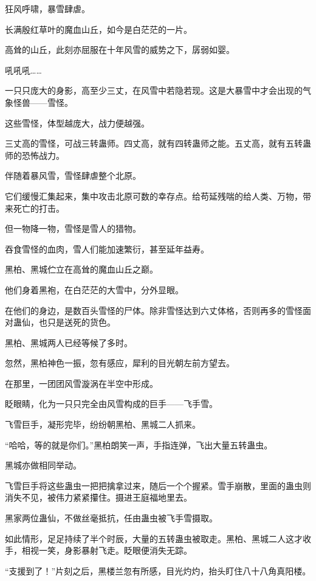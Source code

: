
\begin{this_body}

狂风呼啸，暴雪肆虐。

长满殷红草叶的魔血山丘，如今是白茫茫的一片。

高耸的山丘，此刻亦屈服在十年风雪的威势之下，孱弱如婴。

吼吼吼……

一只只庞大的身影，高至少三丈，在风雪中若隐若现。这是大暴雪中才会出现的气象怪兽——雪怪。

这些雪怪，体型越庞大，战力便越强。

三丈高的雪怪，可战三转蛊师。四丈高，就有四转蛊师之能。五丈高，就有五转蛊师的恐怖战力。

伴随着暴风雪，雪怪肆虐整个北原。

它们缓慢汇集起来，集中攻击北原可数的幸存点。给苟延残喘的给人类、万物，带来死亡的打击。

但一物降一物，雪怪是雪人的猎物。

吞食雪怪的血肉，雪人们能加速繁衍，甚至延年益寿。

黑柏、黑城伫立在高耸的魔血山丘之巅。

他们身着黑袍，在白茫茫的大雪中，分外显眼。

在他们的身边，是数百头雪怪的尸体。除非雪怪达到六丈体格，否则再多的雪怪面对蛊仙，也只是送死的货色。

黑柏、黑城两人已经等候了多时。

忽然，黑柏神色一振，忽有感应，犀利的目光朝左前方望去。

在那里，一团团风雪漩涡在半空中形成。

眨眼睛，化为一只只完全由风雪构成的巨手——飞手雪。

飞雪巨手，凝形完毕，纷纷朝黑柏、黑城二人抓来。

“哈哈，等的就是你们。”黑柏朗笑一声，手指连弹，飞出大量五转蛊虫。

黑城亦做相同举动。

飞雪巨手将这些蛊虫一把把擒拿过来，随后一个个握紧。雪手崩散，里面的蛊虫则消失不见，被伟力紧紧攥住。摄进王庭福地里去。

黑家两位蛊仙，不做丝毫抵抗，任由蛊虫被飞手雪摄取。

如此情形，足足持续了半个时辰，大量的五转蛊虫被取走。黑柏、黑城二人这才收手，相视一笑，身影暴射飞走。眨眼便消失无踪。

“支援到了！”片刻之后，黑楼兰忽有所感，目光灼灼，抬头盯住八十八角真阳楼。


\end{this_body}
